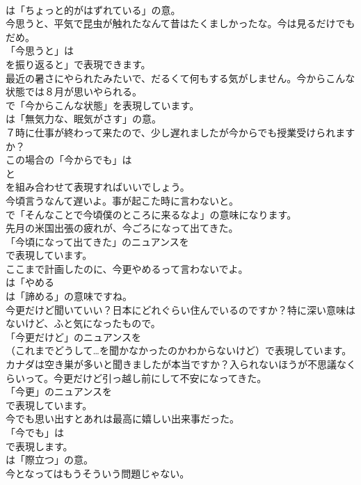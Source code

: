 \documentclass[8pt]{extreport}
\begin{document}
\begin{CJK}{UTF8}{min}
\\	は「ちょっと的がはずれている」の意。	
\\	今思うと、平気で昆虫が触れたなんて昔はたくましかったな。今は見るだけでもだめ。 
\\	「今思うと」は
\\	を振り返ると」で表現できます。	
\\	最近の暑さにやられたみたいで、だるくて何もする気がしません。今からこんな状態では８月が思いやられる。 
\\	で「今からこんな状態」を表現しています。
\\	は「無気力な、眠気がさす」の意。	
\\	７時に仕事が終わって来たので、少し遅れましたが今からでも授業受けられますか？ 
\\	この場合の「今からでも」は 
\\	と 
\\	を組み合わせて表現すればいいでしょう。	
\\	今頃言うなんて遅いよ。事が起こた時に言わないと。 
\\	で「そんなことで今頃僕のところに来るなよ」の意味になります。	
\\	先月の米国出張の疲れが、今ごろになって出てきた。 
\\	「今頃になって出てきた」のニュアンスを 
\\	で表現しています。	
\\	ここまで計画したのに、今更やめるって言わないでよ。 
\\	は「やめる
\\	は「諦める」の意味ですね。	
\\	今更だけど聞いていい？日本にどれぐらい住んでいるのですか？特に深い意味はないけど、ふと気になったもので。 
\\	「今更だけど」のニュアンスを
\\	（これまでどうして…を聞かなかったのかわからないけど）で表現しています。	
\\	カナダは空き巣が多いと聞きましたが本当ですか？入られないほうが不思議なくらいって。今更だけど引っ越し前にして不安になってきた。 
\\	「今更」のニュアンスを 
\\	で表現しています。	
\\	今でも思い出すとあれは最高に嬉しい出来事だった。 
\\	「今でも」は
\\	で表現します。
\\	は「際立つ」の意。	
\\	今となってはもうそういう問題じゃない。 

\end{CJK}
\end{document}
